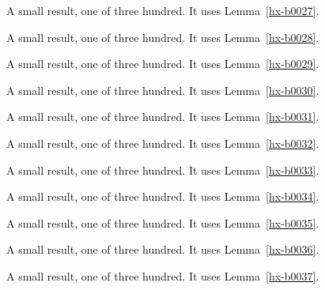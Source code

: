 \begin{lemma}[Bulk 28]\label{hx-b0028}
A small result, one of three hundred. It uses Lemma~\ref{hx-b0027}.
\end{lemma}

\begin{lemma}[Bulk 29]\label{hx-b0029}
A small result, one of three hundred. It uses Lemma~\ref{hx-b0028}.
\end{lemma}

\begin{lemma}[Bulk 30]\label{hx-b0030}
A small result, one of three hundred. It uses Lemma~\ref{hx-b0029}.
\end{lemma}

\begin{lemma}[Bulk 31]\label{hx-b0031}
A small result, one of three hundred. It uses Lemma~\ref{hx-b0030}.
\end{lemma}

\begin{lemma}[Bulk 32]\label{hx-b0032}
A small result, one of three hundred. It uses Lemma~\ref{hx-b0031}.
\end{lemma}

\begin{lemma}[Bulk 33]\label{hx-b0033}
A small result, one of three hundred. It uses Lemma~\ref{hx-b0032}.
\end{lemma}

\begin{lemma}[Bulk 34]\label{hx-b0034}
A small result, one of three hundred. It uses Lemma~\ref{hx-b0033}.
\end{lemma}

\begin{lemma}[Bulk 35]\label{hx-b0035}
A small result, one of three hundred. It uses Lemma~\ref{hx-b0034}.
\end{lemma}

\begin{lemma}[Bulk 36]\label{hx-b0036}
A small result, one of three hundred. It uses Lemma~\ref{hx-b0035}.
\end{lemma}

\begin{lemma}[Bulk 37]\label{hx-b0037}
A small result, one of three hundred. It uses Lemma~\ref{hx-b0036}.
\end{lemma}

\begin{lemma}[Bulk 38]\label{hx-b0038}
A small result, one of three hundred. It uses Lemma~\ref{hx-b0037}.
\end{lemma}

